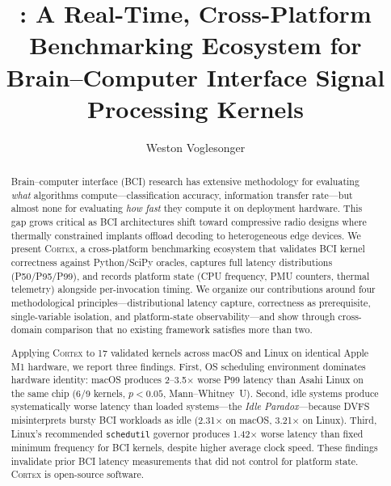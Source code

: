\documentclass[sigplan,10pt]{acmart}
\title{\cortex{}: A Real-Time, Cross-Platform Benchmarking Ecosystem for Brain--Computer Interface Signal Processing Kernels}
\author{Weston Voglesonger}
\affiliation{%
  \institution{University of North Carolina at Chapel Hill}
  \department{Department of Computer Science}
}
\newcommand{\cortex}{\textsc{Cortex}}
\begin{document}
\maketitle


\begin{abstract}
Brain--computer interface (BCI) research has extensive methodology for evaluating \emph{what} algorithms compute---classification accuracy, information transfer rate---but almost none for evaluating \emph{how fast} they compute it on deployment hardware. This gap grows critical as BCI architectures shift toward compressive radio designs where thermally constrained implants offload decoding to heterogeneous edge devices. We present \cortex{}, a cross-platform benchmarking ecosystem that validates BCI kernel correctness against Python/SciPy oracles, captures full latency distributions (P50/P95/P99), and records platform state (CPU frequency, PMU counters, thermal telemetry) alongside per-invocation timing. We organize our contributions around four methodological principles---distributional latency capture, correctness as prerequisite, single-variable isolation, and platform-state observability---and show through cross-domain comparison that no existing framework satisfies more than two.

Applying \cortex{} to 17 validated kernels across macOS and Linux on identical Apple M1 hardware, we report three findings. First, OS scheduling environment dominates hardware identity: macOS produces 2--3.5$\times$ worse P99 latency than Asahi Linux on the same chip (6/9 kernels, $p < 0.05$, Mann--Whitney~U). Second, idle systems produce systematically worse latency than loaded systems---the \emph{Idle Paradox}---because DVFS misinterprets bursty BCI workloads as idle (2.31$\times$ on macOS, 3.21$\times$ on Linux). Third, Linux's recommended \texttt{schedutil} governor produces 1.42$\times$ worse latency than fixed minimum frequency for BCI kernels, despite higher average clock speed. These findings invalidate prior BCI latency measurements that did not control for platform state. \cortex{} is open-source software.
\end{abstract}

\end{document}
